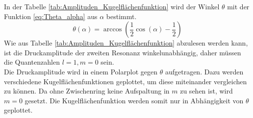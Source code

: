 \FloatBarrier
In der Tabelle \ref{tab:Amplituden_Kugelflächenfunktion} wird der Winkel $\theta$ mit der Funktion \eqref{eq:Theta_alpha} aus $\alpha$ bestimmt.
\begin{equation}
    \label{eq:Theta_alpha}
    \theta(\alpha) = \arccos\left( \frac{1}{2} \cos\left( \alpha \right) -\frac{1}{2} \right)
\end{equation}
Wie aus Tabelle \ref{tab:Amplituden_Kugelflächenfunktion} abzulesen werden kann, ist die Druckamplitude der zweiten Resonanz 
winkelunabhängig, daher müssen die Quantenzahlen $l=1,m=0$ sein.\\
Die Druckamplitude wird in einem Polarplot gegen $\theta$ aufgetragen. Dazu werden verschiedene Kugelflächenfunktionen 
geplottet, um diese miteinander vergleichen zu können. Da ohne Zwischenring keine Aufspaltung in $m$ zu sehen ist, wird $m=0$ gesetzt.
Die Kugelflächenfunktion werden somit nur in Abhängigkeit von $\theta$ geplottet.
\FloatBarrier
